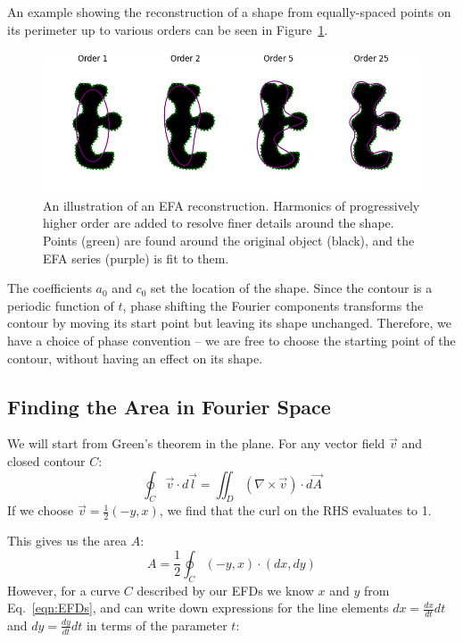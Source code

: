 \documentclass[11pt,a4paper,notitlepage]{article}
\begin{document}
An example showing the reconstruction of a shape from equally-spaced points on its perimeter up to various orders
can be seen in Figure~\ref{fig:efa_example}.
\begin{figure}[h!]
	\centering
	\includegraphics[width=\textwidth]{blob_efa.png}
	\caption{
		An illustration of an EFA reconstruction.
		Harmonics of progressively higher order are added to resolve finer details around the shape.
		Points (green) are found around the original object (black), and the EFA series (purple) is fit to them.
	}
	\label{fig:efa_example}
\end{figure}

The coefficients $a_0$ and $c_0$ set the location of the shape.
Since the contour is a periodic function of $t$, phase shifting the Fourier components transforms
the contour by moving its start point but leaving its shape unchanged.
Therefore, we have a choice of phase convention -- we are free to choose the starting point of the contour, without
having an effect on its shape.

\subsection{Finding the Area in Fourier Space}
We will start from Green's theorem in the plane. For any vector field $\vec{v}$ and closed contour $C$:
\begin{equation}
	\label{eqn:green_theorem}
	\oint_C \vec{v} \cdot d\vec{l} = \iint_D (\nabla \times \vec{v}) \cdot d\vec{A}
\end{equation}
If we choose $\vec{v} = \frac{1}{2}\left(-y, x\right)$, we find that the curl on the RHS evaluates to 1.

This gives us the area $A$:
\begin{equation}
	\label{eqn:area_int}
	A = \frac{1}{2}\oint_C \left(-y, x\right) \cdot \left(dx, dy\right)
\end{equation}
However, for a curve $C$ described by our EFDs we know $x$ and $y$ from Eq.~\ref{eqn:EFDs},
and can write down expressions for the line elements $dx = \frac{dx}{dt}dt$ and $dy = \frac{dy}{dt}dt$
in terms of the parameter $t$:
\end{document}
